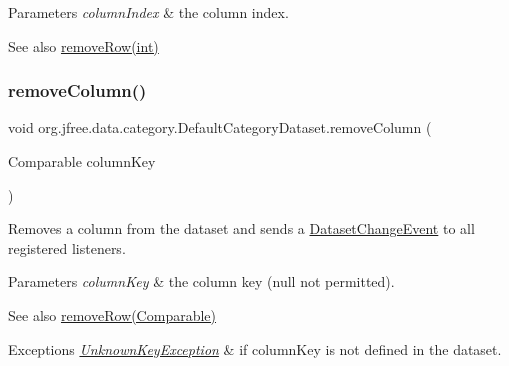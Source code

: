 \begin{DoxyParams}{Parameters}
{\em column\+Index} & the column index.\\
\hline
\end{DoxyParams}
\begin{DoxySeeAlso}{See also}
\mbox{\hyperlink{classorg_1_1jfree_1_1data_1_1category_1_1_default_category_dataset_a6c0fdda202f604d4c7536bafcf853723}{remove\+Row(int)}} 
\end{DoxySeeAlso}
\mbox{\label{classorg_1_1jfree_1_1data_1_1category_1_1_default_category_dataset_a6ba7263d721920a0981bf339ad9bea7b}} 
\subsubsection{\texorpdfstring{remove\+Column()}{removeColumn()}\hspace{0.1cm}{\footnotesize\ttfamily [2/2]}}
{\footnotesize\ttfamily void org.\+jfree.\+data.\+category.\+Default\+Category\+Dataset.\+remove\+Column (\begin{DoxyParamCaption}\item[{Comparable}]{column\+Key }\end{DoxyParamCaption})}

Removes a column from the dataset and sends a \mbox{\hyperlink{}{Dataset\+Change\+Event}} to all registered listeners.


\begin{DoxyParams}{Parameters}
{\em column\+Key} & the column key ({\ttfamily null} not permitted).\\
\hline
\end{DoxyParams}
\begin{DoxySeeAlso}{See also}
\mbox{\hyperlink{classorg_1_1jfree_1_1data_1_1category_1_1_default_category_dataset_ab15f418012a69d568cc956997c1e943d}{remove\+Row(\+Comparable)}}
\end{DoxySeeAlso}

\begin{DoxyExceptions}{Exceptions}
{\em \mbox{\hyperlink{classorg_1_1jfree_1_1data_1_1_unknown_key_exception}{Unknown\+Key\+Exception}}} & if {\ttfamily column\+Key} is not defined in the dataset. \\
\hline
\end{DoxyExceptions}
\mbox{\label{classorg_1_1jfree_1_1data_1_1category_1_1_default_category_dataset_a6c0fdda202f604d4c7536bafcf853723}} 

